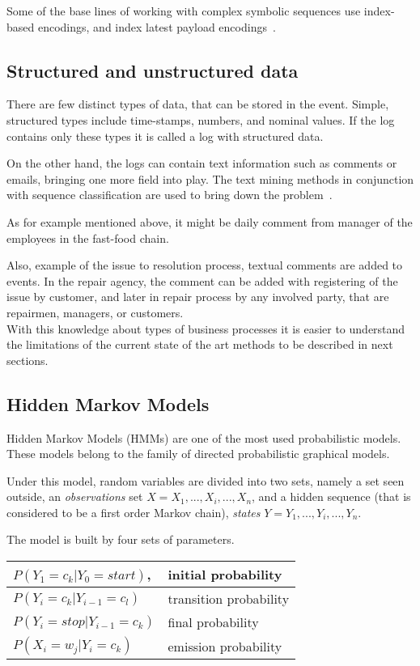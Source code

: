 Some of the base lines of working with complex symbolic sequences use index-based encodings, and index latest payload encodings~\cite{Leontjeva2015}.   

\subsection{Structured and unstructured data}

There are few distinct types of data, that can be stored in the event. Simple, structured types include time-stamps, numbers, and nominal values. If the log contains only these types it is called a log with structured data. 

On the other hand, the logs can contain text information such as comments or emails, bringing one more field into play. The text mining methods in conjunction with sequence classification are used to bring down the problem~\cite{Teinemaa2016}.

As for example mentioned above, it might be daily comment from manager of the employees in the fast-food chain. 

Also, example of the issue to resolution process, textual comments are added to events. In the repair agency, the comment can be added with registering of the issue by customer, and later in repair process by any involved party, that are repairmen, managers, or customers.
\\

With this knowledge about types of business processes it is easier to understand the limitations of the current state of the art methods to be described in next sections. 


\subsection{Hidden Markov Models}
Hidden Markov Models (HMMs) are one of the most used probabilistic models. These models belong to the family of directed probabilistic graphical models. 

Under this model, random variables are divided into two sets, namely a set seen outside, an \textit{observations} set $X=X_1,...,X_i,...,X_n$, and a hidden sequence (that is considered to be a first order Markov chain), \textit{states} $Y=Y_1,...,Y_i,...,Y_n$.

The model is built by four sets of parameters. 

\begin{center}
	\centering
	\begin{tabular}{| l | l  |}	
		\hline
		$P(Y_1 = c_k | Y_0 = start) $, & initial probability \\
		\hline
		$P(Y_i = c_k | Y_{i-1} = c_l) $ & transition probability \\
		\hline
		$P(Y_i = stop | Y_{i-1} = c_k) $ & final probability \\
		\hline
		$P(X_i = w_j | Y_{i} = c_k) $ & emission probability \\
		\hline
	\end{tabular}
\end{center}

